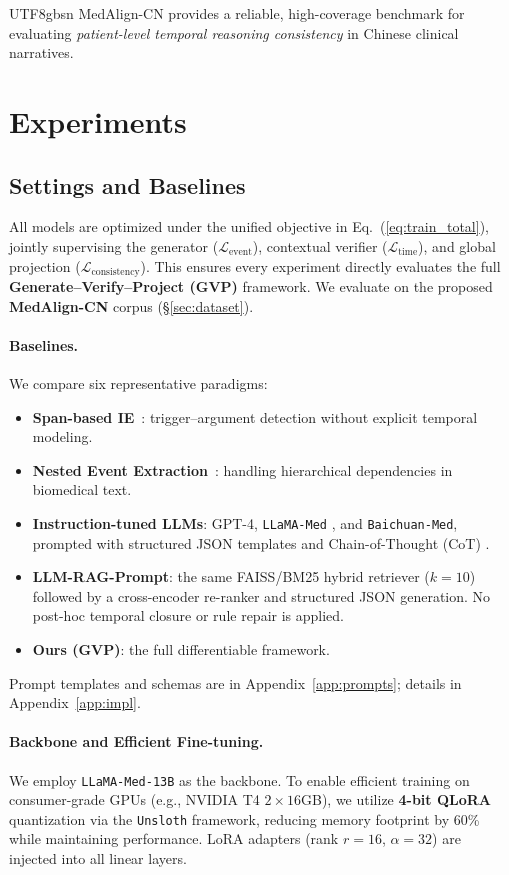 \documentclass[11pt]{article}
\begin{document}
\begin{CJK*}{UTF8}{gbsn}
MedAlign-CN provides a reliable, high-coverage benchmark for evaluating \textit{patient-level temporal reasoning consistency} in Chinese clinical narratives.

\section{Experiments}
\label{sec:exp}

\subsection{Settings and Baselines}
All models are optimized under the unified objective in Eq.~(\ref{eq:train_total}), jointly supervising the generator ($\mathcal{L}_{\text{event}}$), contextual verifier ($\mathcal{L}_{\text{time}}$), and global projection ($\mathcal{L}_{\text{consistency}}$). This ensures every experiment directly evaluates the full \textbf{Generate–Verify–Project (GVP)} framework. We evaluate on the proposed \textbf{MedAlign-CN} corpus (§\ref{sec:dataset}).

\paragraph{Baselines.}
We compare six representative paradigms:
\begin{itemize}[noitemsep,topsep=2pt,leftmargin=1.2em]
  \item \textbf{Span-based IE}~\cite{lin2020joint, wadden2019dygie}: trigger–argument detection without explicit temporal modeling.
  \item \textbf{Nested Event Extraction}~\cite{nagata2020deepeventmine}: handling hierarchical dependencies in biomedical text.
  \item \textbf{Instruction-tuned LLMs}: GPT-4, \texttt{LLaMA-Med} \cite{touvron2023llama}, and \texttt{Baichuan-Med}, prompted with structured JSON templates and Chain-of-Thought (CoT) \cite{wei2022cot}.
  \item \textbf{LLM-RAG-Prompt}: the same FAISS/BM25 hybrid retriever ($k{=}10$) followed by a cross-encoder re-ranker and structured JSON generation. No post-hoc temporal closure or rule repair is applied.
  \item \textbf{Ours (GVP)}: the full differentiable framework.
\end{itemize}
Prompt templates and schemas are in Appendix~\ref{app:prompts}; details in Appendix~\ref{app:impl}.

\paragraph{Backbone and Efficient Fine-tuning.}
We employ \texttt{LLaMA-Med-13B} as the backbone. To enable efficient training on consumer-grade GPUs (e.g., NVIDIA T4 $2{\times}16$GB), we utilize \textbf{4-bit QLoRA} quantization via the \texttt{Unsloth} framework, reducing memory footprint by 60\% while maintaining performance. LoRA adapters (rank $r{=}16$, $\alpha{=}32$) are injected into all linear layers.


\end{CJK*}
\end{document}
